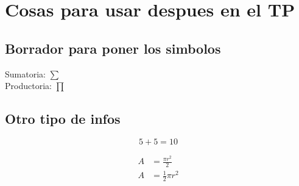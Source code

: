 \documentclass{article}
\begin{document}
\section{Cosas para usar despues en el TP}
\subsection{Borrador para poner los simbolos}
Sumatoria: $\sum$ \\
Productoria: $\prod$

\subsection{Otro tipo de infos}
\begin{equation}
    5 + 5 = 10
\end{equation}


\begin{equation} \label{eq1}
    \begin{split}
        A & = \frac{\pi r^2}{2} \\
        A & = \frac{1}{2} \pi r^2
    \end{split}
\end{equation}
\end{document}
